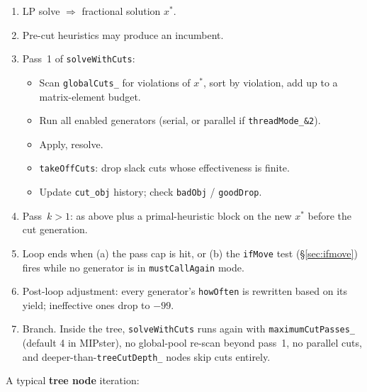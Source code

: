 \documentclass[11pt,a4paper]{article}
\begin{document}
\begin{enumerate}[leftmargin=*]
  \item LP solve $\Rightarrow$ fractional solution $x^\ast$.
  \item Pre-cut heuristics may produce an incumbent.
  \item Pass~1 of \texttt{solveWithCuts}:
    \begin{itemize}
      \item Scan \texttt{globalCuts\_} for violations of $x^\ast$,
            sort by violation, add up to a matrix-element budget.
      \item Run all enabled generators (serial, or parallel if
            \texttt{threadMode\_\&2}).
      \item Apply, resolve.
      \item \texttt{takeOffCuts}: drop slack cuts whose
            effectiveness is finite.
      \item Update \texttt{cut\_obj} history; check \texttt{badObj}
            / \texttt{goodDrop}.
    \end{itemize}
  \item Pass~$k\!>\!1$: as above plus a primal-heuristic block on
        the new $x^\ast$ before the cut generation.
  \item Loop ends when (a) the pass cap is hit, or (b) the
        \texttt{ifMove} test (\S\ref{sec:ifmove}) fires while no
        generator is in \texttt{mustCallAgain} mode.
  \item Post-loop adjustment: every generator's \texttt{howOften} is
        rewritten based on its yield; ineffective ones drop to
        $-99$.
  \item Branch.  Inside the tree, \texttt{solveWithCuts} runs again
        with \texttt{maximumCutPasses\_} (default 4 in MIPster), no
        global-pool re-scan beyond pass~1, no parallel cuts, and
        deeper-than-\texttt{treeCutDepth\_} nodes skip cuts
        entirely.
\end{enumerate}

A typical \textbf{tree node} iteration:
\end{document}
